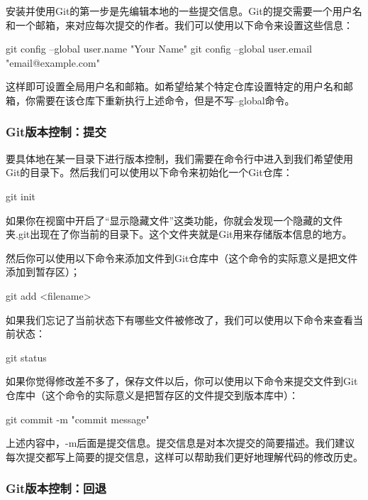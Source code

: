 \documentclass[12pt]{report}
\begin{document}
安装并使用Git的第一步是先编辑本地的一些提交信息。Git的提交需要一个用户名和一个邮箱，来对应每次提交的作者。我们可以使用以下命令来设置这些信息：

\begin{codebox}[title=设置Git用户名和邮箱]
    git config --global user.name "Your Name"
    git config --global user.email "email@example.com"
\end{codebox}

这样即可设置全局用户名和邮箱。如希望给某个特定仓库设置特定的用户名和邮箱，你需要在该仓库下重新执行上述命令，但是不写--global命令。

\subsubsection{Git版本控制：提交}

要具体地在某一目录下进行版本控制，我们需要在命令行中进入到我们希望使用Git的目录下。然后我们可以使用以下命令来初始化一个Git仓库：

\begin{codebox}[title=初始化Git仓库]
    git init
\end{codebox}

如果你在视窗中开启了“显示隐藏文件”这类功能，你就会发现一个隐藏的文件夹.git出现在了你当前的目录下。这个文件夹就是Git用来存储版本信息的地方。

然后你可以使用以下命令来添加文件到Git仓库中（这个命令的实际意义是把文件添加到暂存区）；

\begin{codebox}[title=添加文件到Git仓库]
    git add <filename>
\end{codebox}

如果我们忘记了当前状态下有哪些文件被修改了，我们可以使用以下命令来查看当前状态：
\begin{codebox}[title=查看当前状态]
    git status
\end{codebox}

如果你觉得修改差不多了，保存文件以后，你可以使用以下命令来提交文件到Git仓库中（这个命令的实际意义是把暂存区的文件提交到版本库中）：

\begin{codebox}[title=提交文件到Git仓库]
    git commit -m "commit message"
\end{codebox}

上述内容中，-m后面是提交信息。提交信息是对本次提交的简要描述。我们建议每次提交都写上简要的提交信息，这样可以帮助我们更好地理解代码的修改历史。

\subsubsection{Git版本控制：回退}
\end{document}
